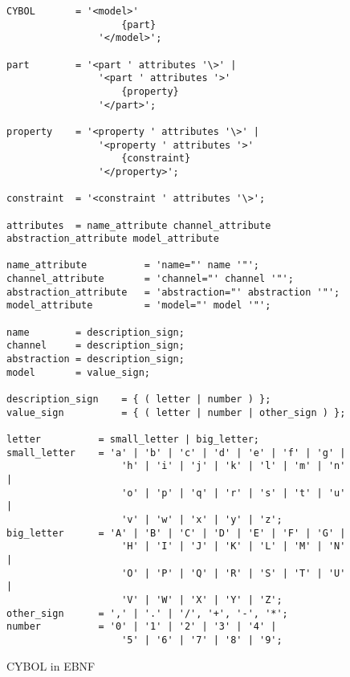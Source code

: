 \begin{figure}[ht]
    \bigskip
    \bigskip
    \begin{scriptsize}
        \begin{verbatim}
CYBOL       = '<model>'
                    {part}
                '</model>';

part        = '<part ' attributes '\>' |
                '<part ' attributes '>'
                    {property}
                '</part>';

property    = '<property ' attributes '\>' |
                '<property ' attributes '>'
                    {constraint}
                '</property>';

constraint  = '<constraint ' attributes '\>';

attributes  = name_attribute channel_attribute abstraction_attribute model_attribute

name_attribute          = 'name="' name '"';
channel_attribute       = 'channel="' channel '"';
abstraction_attribute   = 'abstraction="' abstraction '"';
model_attribute         = 'model="' model '"';

name        = description_sign;
channel     = description_sign;
abstraction = description_sign;
model       = value_sign;

description_sign    = { ( letter | number ) };
value_sign          = { ( letter | number | other_sign ) };

letter          = small_letter | big_letter;
small_letter    = 'a' | 'b' | 'c' | 'd' | 'e' | 'f' | 'g' |
                    'h' | 'i' | 'j' | 'k' | 'l' | 'm' | 'n' |
                    'o' | 'p' | 'q' | 'r' | 's' | 't' | 'u' |
                    'v' | 'w' | 'x' | 'y' | 'z';
big_letter      = 'A' | 'B' | 'C' | 'D' | 'E' | 'F' | 'G' |
                    'H' | 'I' | 'J' | 'K' | 'L' | 'M' | 'N' |
                    'O' | 'P' | 'Q' | 'R' | 'S' | 'T' | 'U' |
                    'V' | 'W' | 'X' | 'Y' | 'Z';
other_sign      = ',' | '.' | '/', '+', '-', '*';
number          = '0' | '1' | '2' | '3' | '4' |
                    '5' | '6' | '7' | '8' | '9';
        \end{verbatim}
    \end{scriptsize}
    \caption{CYBOL in EBNF}
    \label{ebnf_figure}
\end{figure}
